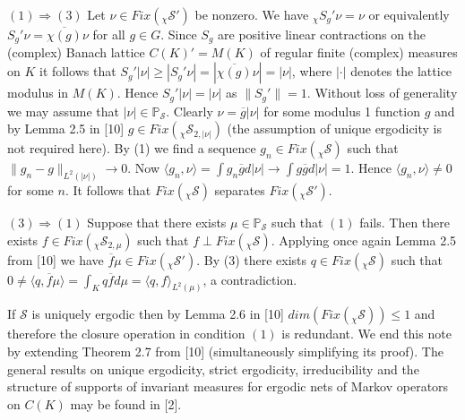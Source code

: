 \documentclass{amsart}
\theoremstyle{definition}
\theoremstyle{remark}
\numberwithin{equation}{section}
\newcommand{\bs}{\rightline{$\blacksquare$}}
\begin{document}
$(1) \Rightarrow (3)$ Let $\nu \in Fix(_{\chi}\mathcal{S}')$ be nonzero.
We have  $_{\chi}S_g'\nu = \nu $ or equivalently $S_g'\nu = \overline{\chi (g)}\nu$ for all
$g\in G$.
Since $S_g$ are positive linear contractions on the (complex) Banach lattice
$C(K)' = M(K)$ of regular finite (complex) measures on $K$ it follows that
$S_g'|\nu | \geq |S_g'\nu | = |\overline{\chi(g)}\nu | = |\nu |$, where
$|\cdot |$ denotes the lattice modulus in $M(K)$. Hence $S_g'|\nu | = |\nu |$ as $\| S_g' \| = 1$.
Without loss of generality we may assume that $|\nu | \in \mathbb{P}_{\mathcal{S}}$.
Clearly $\nu = \overline{g}|\nu |$ for some modulus 1 function $g$ and by Lemma 2.5 in [10]
$g\in Fix(_{\chi}\mathcal{S}_{2,|\nu |})$ (the assumption of unique ergodicity
is not required here). By (1) we find a sequence $g_n \in Fix(_{\chi}\mathcal{S})$ such that
$\| g_n - g \|_{L^2(| \nu |)} \to 0$. Now $\langle g_n , \nu \rangle  = \int g_n\overline{g}d|\nu |
\to \int g\overline{g}d|\nu | = 1$. Hence $ \langle g_n , \nu \rangle  \neq 0$ for some $n$.
It follows that  $Fix(\mathcal{_{\chi}S})$ separates $Fix(_{\chi}\mathcal{S}')$.

$(3) \Rightarrow (1)$ Suppose that there exists $\mu \in \mathbb{P}_{\mathcal{S}}$
such that $(1)$ fails. Then there exists $f\in Fix(_{\chi}\mathcal{S}_{2,\mu })$ such
that $f \perp Fix(_{\chi}\mathcal{S})$. Applying once again Lemma 2.5 from [10]
we have $\overline{f}\mu \in Fix(_{\chi}\mathcal{S}')$. By (3) there
exists $q \in Fix(_{\chi}\mathcal{S})$ such that $0 \neq \langle q, \overline{f}\mu \rangle
 = \int_K q\overline{f}d\mu = \langle q , f \rangle_{L^2(\mu)}$, a contradiction.

\bs

If $\mathcal{S}$ is uniquely ergodic then by Lemma 2.6 in [10]
$dim (Fix(_{\chi}\mathcal{S})) \leq 1 $ and therefore the closure operation
in condition $(1)$ is redundant. We end this note by extending Theorem 2.7 from [10]
(simultaneously simplifying its proof).
The general results on  unique ergodicity, strict ergodicity, irreducibility
and the structure of supports of invariant measures for
ergodic nets of Markov operators on $C(K)$ may be found in [2].
\end{document}
